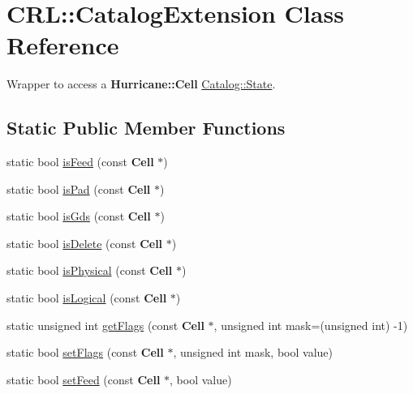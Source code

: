 \hypertarget{classCRL_1_1CatalogExtension}{}\section{C\+RL\+:\+:Catalog\+Extension Class Reference}
\label{classCRL_1_1CatalogExtension}


Wrapper to access a \textbf{ Hurricane\+::\+Cell} \mbox{\hyperlink{classCRL_1_1Catalog_1_1State}{Catalog\+::\+State}}.  


\subsection*{Static Public Member Functions}
\begin{DoxyCompactItemize}
\item 
static bool \mbox{\hyperlink{classCRL_1_1CatalogExtension_a5feda5d6fba490a71e3742361ec7b4a1}{is\+Feed}} (const \textbf{ Cell} $\ast$)
\item 
static bool \mbox{\hyperlink{classCRL_1_1CatalogExtension_a2695acabeac2f224fa4ac3a9563aeee9}{is\+Pad}} (const \textbf{ Cell} $\ast$)
\item 
static bool \mbox{\hyperlink{classCRL_1_1CatalogExtension_a37c8d304e7386ee31b73c826cb929e5f}{is\+Gds}} (const \textbf{ Cell} $\ast$)
\item 
static bool \mbox{\hyperlink{classCRL_1_1CatalogExtension_a90e941d2349f5a0f4f7fefb41b434b0a}{is\+Delete}} (const \textbf{ Cell} $\ast$)
\item 
static bool \mbox{\hyperlink{classCRL_1_1CatalogExtension_a3af53ef4a7fa512a079adbcb68677e2f}{is\+Physical}} (const \textbf{ Cell} $\ast$)
\item 
static bool \mbox{\hyperlink{classCRL_1_1CatalogExtension_a558c506a28d2230e592080dccbcca380}{is\+Logical}} (const \textbf{ Cell} $\ast$)
\item 
static unsigned int \mbox{\hyperlink{classCRL_1_1CatalogExtension_a9525c2253aa310a63de32caaeb694e66}{get\+Flags}} (const \textbf{ Cell} $\ast$, unsigned int mask=(unsigned int) -\/1)
\item 
static bool \mbox{\hyperlink{classCRL_1_1CatalogExtension_ab9475735032d500f4d4a8cf980864b3e}{set\+Flags}} (const \textbf{ Cell} $\ast$, unsigned int mask, bool value)
\item 
static bool \mbox{\hyperlink{classCRL_1_1CatalogExtension_ab82e4b139ca636feaca5d97836891b68}{set\+Feed}} (const \textbf{ Cell} $\ast$, bool value)
\item 

\end{DoxyCompactItemize}
